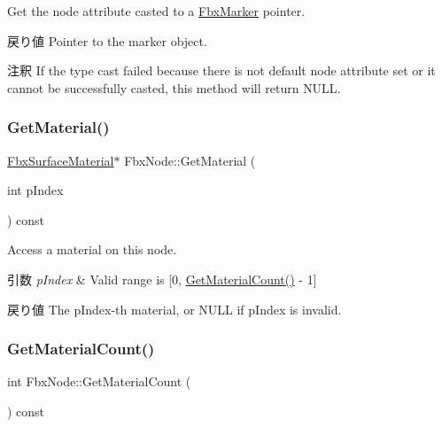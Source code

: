Get the node attribute casted to a \hyperlink{class_fbx_marker}{Fbx\+Marker} pointer. \begin{DoxyReturn}{戻り値}
Pointer to the marker object. 
\end{DoxyReturn}
\begin{DoxyRemark}{注釈}
If the type cast failed because there is not default node attribute set or it cannot be successfully casted, this method will return {\ttfamily N\+U\+LL}. 
\end{DoxyRemark}
\mbox{\label{class_fbx_node_aa89bfed69b0fe26ee03708931fbda9c2}} 
\subsubsection{\texorpdfstring{Get\+Material()}{GetMaterial()}}
{\footnotesize\ttfamily \hyperlink{class_fbx_surface_material}{Fbx\+Surface\+Material}$\ast$ Fbx\+Node\+::\+Get\+Material (\begin{DoxyParamCaption}\item[{int}]{p\+Index }\end{DoxyParamCaption}) const}

Access a material on this node. 
\begin{DoxyParams}{引数}
{\em p\+Index} & Valid range is \mbox{[}0, \hyperlink{class_fbx_node_a00fabc04c839f665fa5d4a0b49859745}{Get\+Material\+Count()} -\/ 1\mbox{]} \\
\hline
\end{DoxyParams}
\begin{DoxyReturn}{戻り値}
The p\+Index-\/th material, or N\+U\+LL if p\+Index is invalid. 
\end{DoxyReturn}
\mbox{\label{class_fbx_node_a00fabc04c839f665fa5d4a0b49859745}} 
\subsubsection{\texorpdfstring{Get\+Material\+Count()}{GetMaterialCount()}}
{\footnotesize\ttfamily int Fbx\+Node\+::\+Get\+Material\+Count (\begin{DoxyParamCaption}{ }\end{DoxyParamCaption}) const}

